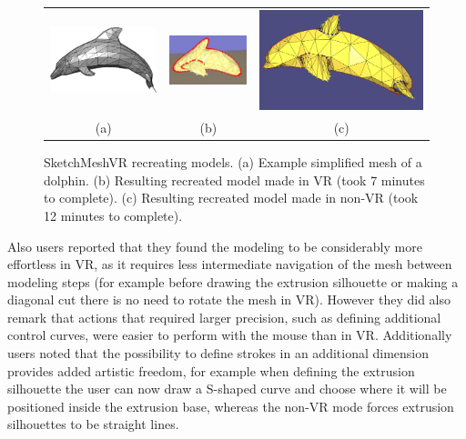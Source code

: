 \begin{figure}[!h]
    \centering
    \setlength{\tabcolsep}{0.0130\linewidth}
    \begin{tabular}{@{}ccc@{}}
    \includegraphics[width=0.3\linewidth]{figures/example_model_dolphin}&
  	\includegraphics[width=0.3\linewidth]{figures/results_dolphin_model}&
  	\includegraphics[width=0.3\linewidth]{figures/results_dolphin_model_nonVR}\\

    (a)&(b)&(c)\\
    \end{tabular}
    \caption[SketchMeshVR dolphin model]{SketchMeshVR recreating models.
    	  \textup{(a)} Example simplified mesh of a dolphin.
	  \textup{(b)} Resulting recreated model made in VR (took 7 minutes to complete).
	  \textup{(c)} Resulting recreated model made in non-VR (took 12 minutes to complete).
      \label{fig:recreate_dolphin}}
\end{figure}

Also users reported that they found the modeling to be considerably more effortless in VR, as it requires less intermediate navigation of the mesh between modeling steps (for example before drawing the extrusion silhouette or making a diagonal cut there is no need to rotate the mesh in VR). However they did also remark that actions that required larger precision, such as defining additional control curves, were easier to perform with the mouse than in VR.
Additionally users noted that the possibility to define strokes in an additional dimension provides added artistic freedom, for example when defining the extrusion silhouette the user can now draw a S-shaped curve and choose where it will be positioned inside the extrusion base, whereas the non-VR mode forces extrusion silhouettes to be straight lines. 
